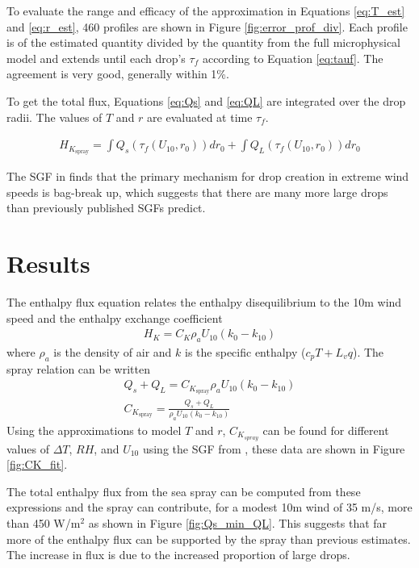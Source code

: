 \documentclass[10pt,a4paper]{article}
\begin{document}
To evaluate the range and efficacy of the approximation in Equations \ref{eq:T_est} and \ref{eq:r_est}, 460 profiles are shown in Figure \ref{fig:error_prof_div}. Each profile is of the estimated quantity divided by the quantity from the full microphysical model and extends until each drop's $\tau_f$ according to Equation \ref{eq:tauf}. The agreement is very good, generally within 1\%. \par 

To get the total flux, Equations \ref{eq:Qs} and \ref{eq:QL} are integrated over the drop radii. The values of $T$ and $r$ are evaluated at time $\tau_f$. 

\begin{align}
H_{K_{\text{spray}}} = \int Q_s(\tau_f(U_{10},r_0)) dr_0 + \int Q_L(\tau_f(U_{10},r_0)) dr_0
\end{align}

The SGF in \citet{Troitskaya2018} finds that the primary mechanism for drop creation in extreme wind speeds is bag-break up, which suggests that there are many more large drops than previously published SGFs predict.

\section{Results}
The enthalpy flux equation relates the enthalpy disequilibrium to the 10m wind speed and the enthalpy exchange coefficient
\begin{align}
H_K = C_K\rho_aU_{10}(k_0-k_{10})
\end{align}
where $\rho_a$ is the density of air and $k$ is the specific enthalpy ($c_pT+L_vq$). The spray relation can be written 
\begin{align}
\nonumber Q_s+Q_L = C_{K_{\text{spray}}}\rho_aU_{10}(k_0-k_{10})\\
C_{K_{\text{spray}}}  = \frac{Q_s+Q_L}{\rho_aU_{10}(k_0-k_{10})}
\end{align}
Using the approximations to model $T$ and $r$, $C_{K_{spray}}$ can be found for different values of $\Delta T$, $RH$, and $U_{10}$ using the SGF from \citet{Troitskaya2018}, these data are shown in Figure \ref{fig:CK_fit}.\par
The total enthalpy flux from the sea spray can be computed from these expressions and the spray can contribute, for a modest 10m wind of 35 m/s, more than 450 W/m$^2$ as shown in Figure \ref{fig:Qs_min_QL}. This suggests that far more of the enthalpy flux can be supported by the spray than previous estimates. The increase in flux is due to the increased proportion of large drops. 
\end{document}
